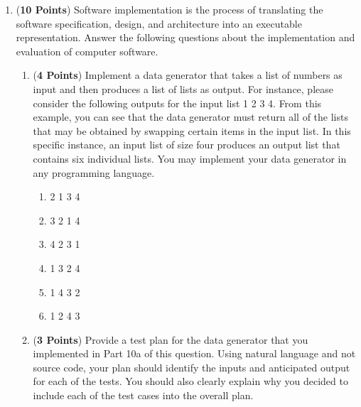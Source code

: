 \documentclass[12pt,epsf,psfig,graphics]{article}
\begin{document}
\begin{enumerate}
\item ({\bf 10 Points}) Software implementation is the process of
  translating the software specification, design, and architecture
  into an executable representation.  Answer the following questions
  about the implementation and evaluation of computer software.

\begin{enumerate}

  \item ({\bf 4 Points}) Implement a data generator that takes a list
    of numbers as input and then produces a list of lists as output.
    For instance, please consider the following outputs for the input
    list 1 2 3 4.  From this example, you can see that the data
    generator must return all of the lists that may be obtained by
    swapping certain items in the input list.  In this specific
    instance, an input list of size four produces an output list that
    contains six individual lists.  You may implement your data
    generator in any programming language.

    \begin{enumerate}

    \item 2 1 3 4
      
    \item 3 2 1 4

    \item 4 2 3 1

    \item 1 3 2 4
        
    \item 1 4 3 2

    \item 1 2 4 3

  \end{enumerate}

  \item ({\bf 3 Points}) Provide a test plan for the data generator that you implemented in Part 10a of this question.
    Using natural language and not source code, your plan should identify the inputs and anticipated output for each of
    the tests.  You should also clearly explain why you decided to include each of the test cases into the overall plan.



\end{enumerate}
\end{enumerate}
\end{document}
